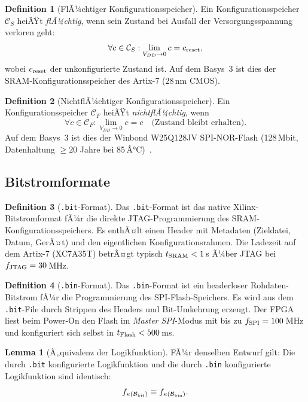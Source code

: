 ﻿\documentclass[a4paper,12pt]{article}
\theoremstyle{definition}
\newtheorem{definition}{Definition}
\newtheorem{lemma}{Lemma}
\begin{document}
\begin{definition}[FlÃ¼chtiger Konfigurationsspeicher]
    Ein Konfigurationsspeicher $\mathcal{C}_S$ heiÃŸt \emph{flÃ¼chtig}, wenn
    sein Zustand bei Ausfall der Versorgungsspannung verloren geht:
    \[
    \forall c \in \mathcal{C}_S: \lim_{V_{DD} \to 0} c = c_{\rm reset},
    \]
    wobei $c_{\rm reset}$ der unkonfigurierte Zustand ist. Auf dem Basys~3
    ist dies der SRAM-Konfigurationsspeicher des Artix-7 (28\,nm CMOS).
\end{definition}

\begin{definition}[NichtflÃ¼chtiger Konfigurationsspeicher]
    Ein Konfigurationsspeicher $\mathcal{C}_F$ heiÃŸt \emph{nichtflÃ¼chtig}, wenn
    \[
    \forall c \in \mathcal{C}_F: \lim_{V_{DD} \to 0} c = c \quad
    \text{(Zustand bleibt erhalten)}.
    \]
    Auf dem Basys~3 ist dies der Winbond W25Q128JV SPI-NOR-Flash
    (128\,Mbit, Datenhaltung $\geq 20$ Jahre bei 85\,Â°C)~\cite{winbond2021}.
\end{definition}

\subsection{Bitstromformate}

\begin{definition}[\texttt{.bit}-Format]
    Das \texttt{.bit}-Format ist das native Xilinx-Bitstromformat fÃ¼r die
    direkte JTAG-Programmierung des SRAM-Konfigurationsspeichers.
    Es enthÃ¤lt einen Header mit Metadaten (Zieldatei, Datum, GerÃ¤t) und
    den eigentlichen Konfigurationsrahmen. Die Ladezeit auf dem Artix-7
    (XC7A35T) betrÃ¤gt typisch $t_{\rm SRAM} < 1$\,s Ã¼ber JTAG bei
    $f_{\rm JTAG} = 30$\,MHz.
\end{definition}

\begin{definition}[\texttt{.bin}-Format]
    Das \texttt{.bin}-Format ist ein headerloser Rohdaten-Bitstrom fÃ¼r die
    Programmierung des SPI-Flash-Speichers. Es wird aus dem \texttt{.bit}-File
    durch Strippen des Headers und Bit-Umkehrung erzeugt. Der FPGA liest beim
    Power-On den Flash im \emph{Master SPI}-Modus mit bis zu
    $f_{\rm SPI} = 100$\,MHz und konfiguriert sich selbst in
    $t_{\rm Flash} < 500$\,ms.
\end{definition}

\begin{lemma}[Ã„quivalenz der Logikfunktion]
    \label{lem:aequiv}
    FÃ¼r denselben Entwurf gilt: Die durch \texttt{.bit} konfigurierte
    Logikfunktion und die durch \texttt{.bin} konfigurierte Logikfunktion
    sind identisch:
    \[
    f_{\kappa(\mathcal{B}_{\rm bit})} \equiv f_{\kappa(\mathcal{B}_{\rm bin})}.
    \]
\end{lemma}
\end{document}
